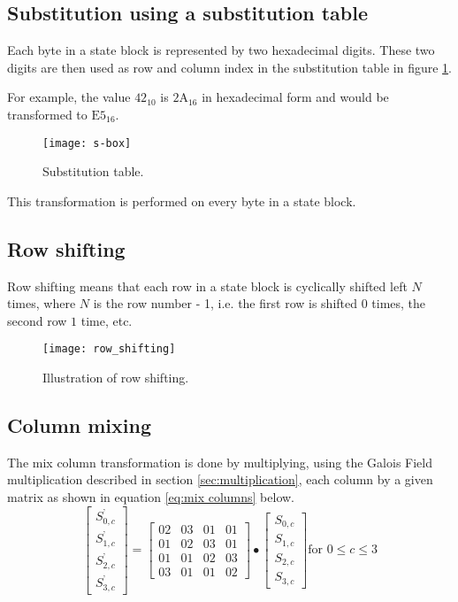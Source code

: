 \documentclass[report.tex]{subfiles}
\begin{document}
\clearpage

\subsection{Substitution using a substitution table}\label{sec:substitution}
Each byte in a state block is represented by two hexadecimal digits. These two digits are then used as row and column index in the substitution table in figure \ref{fig:s-box}.

For example, the value $\textrm{42}_{10}$ is $\textrm{2A}_{16}$ in hexadecimal form and would be transformed to $\textrm{E5}_{16}$.

\begin{figure}[ht]
\centering
\texttt{[image: s-box]}
\caption{Substitution table.\cite{fips}}
\label{fig:s-box}
\end{figure}

This transformation is performed on every byte in a state block.

\subsection{Row shifting}
Row shifting means that each row in a state block is cyclically shifted left $N$ times, where $N$ is the row number - 1, i.e. the first row is shifted $0$ times, the second row $1$ time, etc.

\begin{figure}[ht]
\centering
\texttt{[image: row\_shifting]}
\caption{Illustration of row shifting.\cite{fips}}
\label{fig:row_shifting}
\end{figure}

\subsection{Column mixing}
The mix column transformation is done by multiplying, using the Galois Field multiplication described in section \ref{sec:multiplication}, each column by a given matrix as shown in equation \ref{eq:mix columns} below.
\begin{equation}
\label{eq:mix columns}
	\begin{bmatrix}
	S_{0,c}^\text{'} \\
	S_{1,c}^\text{'} \\
	S_{2,c}^\text{'} \\
	S_{3,c}^\text{'}
	\end{bmatrix}
	=
	\begin{bmatrix}
	02 & 03 & 01 & 01 \\
	01 & 02 & 03 & 01 \\
	01 & 01 & 02 & 03 \\
	03 & 01 & 01 & 02
	\end{bmatrix}
	\bullet
	\begin{bmatrix}
	S_{0,c} \\
	S_{1,c} \\
	S_{2,c} \\
	S_{3,c}
	\end{bmatrix}
	\text{for }0 \leq c \leq 3
\end{equation}
\end{document}
